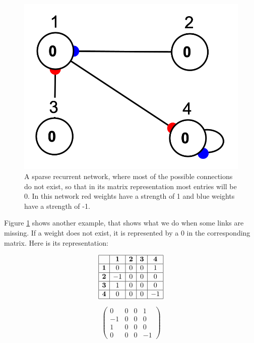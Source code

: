\begin{figure}[h]
\centering
\includegraphics[scale=0.5]{./images/sparseRecurrent.png}
\caption[Jeff Yoshimi.]{A sparse recurrent network, where most of the possible connections do not exist, so that in its matrix representation most entries will be 0. In this network red weights have a strength of 1 and blue weights have a strength of -1.} 
\label{sparseRecurrent}
\end{figure}

Figure \ref{sparseRecurrent} shows another example, that shows what we do when some links are missing. If a weight does not exist, it is represented by a $0$ in the corresponding matrix. Here is its representation:

\begin{minipage}{0.5\textwidth}
\centering
\[
\begin{array}{|c|c|c|c|c|}
\hline
\multicolumn{1}{|c|}{} & \textbf{1} & \textbf{2}  & \textbf{3} & \textbf{4} \\
\hline
\textbf{1} & 0 & 0 & 0 & 1 \\
\hline
\textbf{2} & -1 & 0 & 0 & 0 \\
\hline
\textbf{3} & 1 & 0 & 0 & 0 \\
\hline
\textbf{4} & 0 & 0 & 0 & -1 \\
\hline
\end{array}
\]
\end{minipage}
\begin{minipage}{0.5\textwidth}
\centering
\[
\begin{pmatrix}
0 & 0 & 0 & 1 \\
-1 & 0 & 0 & 0 \\
1 & 0 & 0 & 0 \\
0 & 0 & 0 & -1
\end{pmatrix}
\]
\end{minipage}
\vspace*{.1cm} 

